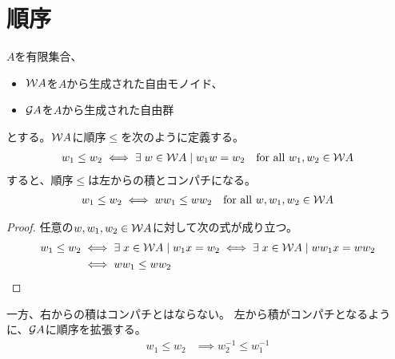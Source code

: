 \section{順序}\label{s1:順序} %
	$A$を有限集合、
	\begin{itemize}\setlength{\itemsep}{-1mm} %
		\item ${{\mathcal{W}}} A$を$A$から生成された自由モノイド、
		\item ${{\mathcal{G}}} A$を$A$から生成された自由群
	\end{itemize} %
	とする。${{\mathcal{W}}} A$に順序$\le$を次のように定義する。
	\begin{equation*}\begin{split}
		w_1\le w_2 \iff \exists\; w\in {\ensuremath{{\mathcal{W}}}} A\;\vert\; w_1w = w_2
		\quad\text{for all }w_1,w_2\in {\ensuremath{{\mathcal{W}}}} A
	\end{split}\end{equation*}
	すると、順序$\le$は左からの積とコンパチになる。
	\begin{equation*}\begin{split}
		w_1\le w_2 \iff ww_1\le ww_2 \quad\text{for all }w,w_1,w_2\in {\ensuremath{{\mathcal{W}}}} A
	\end{split}\end{equation*}
	\begin{proof}任意の$w,w_1,w_2\in {\ensuremath{{\mathcal{W}}}} A$に対して次の式が成り立つ。
	\begin{equation*}\begin{split}
		w_1\le w_2 &\iff \exists\; x\in {\ensuremath{{\mathcal{W}}}} A\;\vert\; w_1x = w_2
		\iff \exists\; x\in {\ensuremath{{\mathcal{W}}}} A\;\vert\; ww_1x = ww_2 \\
		&\iff ww_1\le ww_2
	\end{split}\end{equation*}
	\end{proof}
	一方、右からの積はコンパチとはならない。
	左から積がコンパチとなるように、${{\mathcal{G}}} A$に順序を拡張する。
	\begin{equation*}\begin{split}
		w_1\le w_2 &\implies w_2^{-1}\le w_1^{-1}
	\end{split}\end{equation*}
